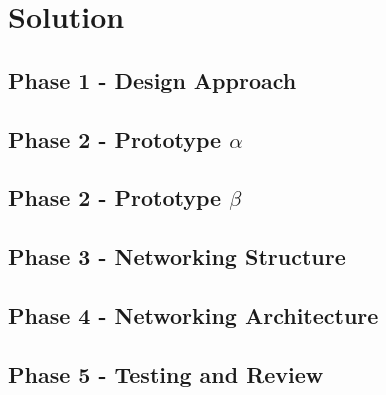 
\chapter{Solution}

\section{Phase 1 - Design Approach}

\section{Phase 2 - Prototype $\alpha$}

\section{Phase 2 - Prototype $\beta$}

\section{Phase 3 - Networking Structure}

\section{Phase 4 - Networking Architecture}

\section{Phase 5 - Testing and Review}
